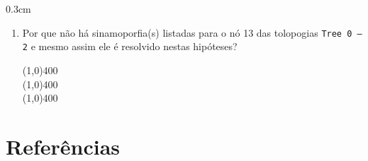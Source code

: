 \begin{refsection}
\begin {myindentpar}{0.3cm}
\begin{enumerate}[\itshape i.]
	\item{Por que não há sinamoporfia(s) listadas para o nó 13 das tolopogias \texttt{Tree 0 --2} e mesmo assim ele é resolvido nestas hipóteses?}

	   \line(1,0){400}\\
	   \line(1,0){400}\\
	   \line(1,0){400}\\


  \end{enumerate}
  \end{myindentpar}
\section{Referências}\label{tut5:refs}
\printbibliography[heading=none]
\end{refsection}
%

